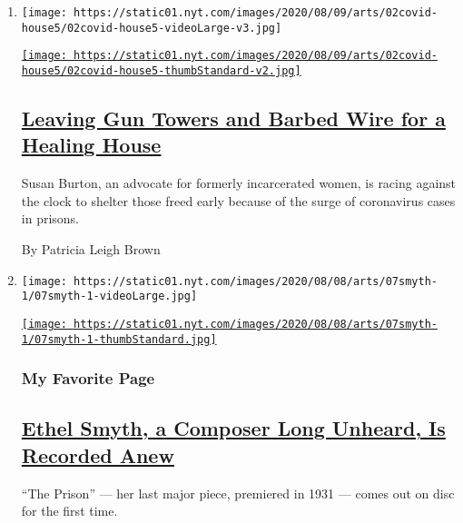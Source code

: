 \begin{enumerate}
\def\labelenumi{\arabic{enumi}.}
\item
  \texttt{[image: https://static01.nyt.com/images/2020/08/09/arts/02covid-house5/02covid-house5-videoLarge-v3.jpg]}

  \href{/2020/08/07/arts/design/susan-burton-reentry-project-prisons-virus.html}{\texttt{[image: https://static01.nyt.com/images/2020/08/09/arts/02covid-house5/02covid-house5-thumbStandard-v2.jpg]}}

  \hypertarget{leaving-gun-towers-and-barbed-wire-for-a-healing-house}{%
  \subsection{\texorpdfstring{\href{/2020/08/07/arts/design/susan-burton-reentry-project-prisons-virus.html}{Leaving
  Gun Towers and Barbed Wire for a Healing
  House}}{Leaving Gun Towers and Barbed Wire for a Healing House}}\label{leaving-gun-towers-and-barbed-wire-for-a-healing-house}}

  Susan Burton, an advocate for formerly incarcerated women, is racing
  against the clock to shelter those freed early because of the surge of
  coronavirus cases in prisons.

  By Patricia Leigh Brown
\item
  \texttt{[image: https://static01.nyt.com/images/2020/08/08/arts/07smyth-1/07smyth-1-videoLarge.jpg]}

  \href{/2020/08/07/arts/music/ethel-smyth-prison-chandos.html}{\texttt{[image: https://static01.nyt.com/images/2020/08/08/arts/07smyth-1/07smyth-1-thumbStandard.jpg]}}

  \hypertarget{my-favorite-page}{%
  \subsubsection{My Favorite Page}\label{my-favorite-page}}

  \hypertarget{ethel-smyth-a-composer-long-unheard-is-recorded-anew}{%
  \subsection{\texorpdfstring{\href{/2020/08/07/arts/music/ethel-smyth-prison-chandos.html}{Ethel
  Smyth, a Composer Long Unheard, Is Recorded
  Anew}}{Ethel Smyth, a Composer Long Unheard, Is Recorded Anew}}\label{ethel-smyth-a-composer-long-unheard-is-recorded-anew}}

  ``The Prison'' --- her last major piece, premiered in 1931 --- comes
  out on disc for the first time.


\end{enumerate}
